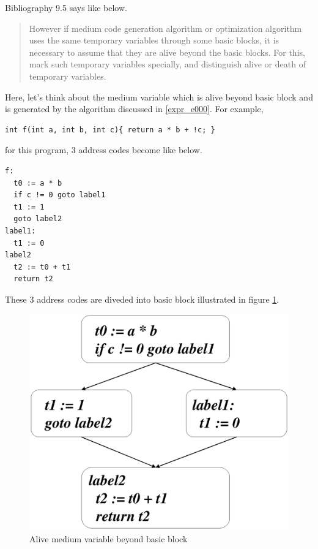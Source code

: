 \label{optimize_e004}
Bibliography \cite{doragon} 9.5 says like below.
\begin{quote}
However if medium code generation algorithm or optimization algorithm
uses the same temporary variables through some basic blocks,
it is necessary to assume that they are alive beyond the basic blocks.
For this, mark such temporary variables specially, and distinguish
alive or death of temporary variables.
\end{quote}
Here, let's think about the medium variable which is alive beyond
basic block and is generated by the algorithm discussed in \ref{expr_e000}.
For example,
\begin{verbatim}
int f(int a, int b, int c){ return a * b + !c; }
\end{verbatim}
for this program, 3 address codes become like below.
\begin{verbatim}
f:
  t0 := a * b
  if c != 0 goto label1
  t1 := 1
  goto label2
label1:
  t1 := 0
label2
  t2 := t0 + t1
  return t2
\end{verbatim}
These 3 address codes are diveded into basic block illustrated in
figure \ref{optimize_e001}.
\begin{figure}[htbp]
\begin{center}
\includegraphics[width=0.89\linewidth,height=1.0\linewidth]{beyond_medium.eps}
\caption{Alive medium variable beyond basic block}
\label{optimize_e001}
\end{center}
\end{figure}
